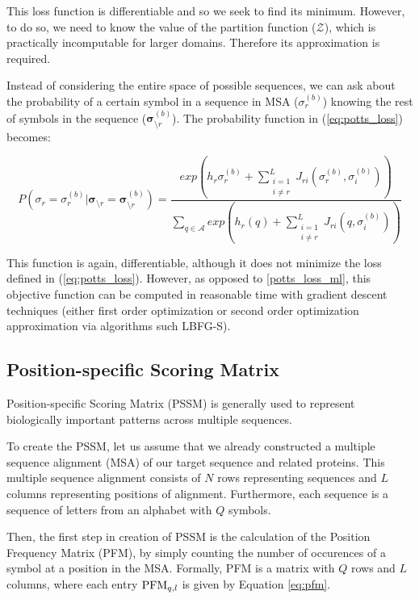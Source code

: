 This loss function is differentiable and so we seek to find its minimum. 
However, to do so, we need to know the value of the partition function ($\mathcal{Z}$), which is practically incomputable for larger domains. 
Therefore its approximation is required.
        
Instead of considering the entire space of possible sequences, we can ask about the probability of a certain symbol in a sequence in MSA ($\sigma_r^{(b)}$) knowing the rest of symbols in the sequence ($\bm{\sigma}_{\setminus r}^{(b)}$). 
The probability function in (\ref{eq:potts_loss}) becomes:
        
$$
P(\sigma_{r} = \sigma_r^{(b)} | \bm{\sigma}_{\setminus r} = \bm{\sigma}_{\setminus r}^{(b)}) = \frac{exp \left(h_r \sigma_r^{(b)} + \sum_{\substack{i = 1\\i\neq r}}^L J_{ri}(\sigma_r^{(b)}, \sigma_i^{(b)})\right)}{\sum_{q \in \mathcal{A}} exp \left(h_r(q) + \sum_{\substack{i = 1\\i\neq r}}^L J_{ri}(q, \sigma_i^{(b)})\right)}$$
        
This function is again, differentiable, although it does not minimize the loss defined in (\ref{eq:potts_loss}).
However, as opposed to \ref{potts_loss_ml}, this objective function can be computed in reasonable time with gradient descent techniques (either first order optimization or second order optimization approximation via algorithms such LBFG-S)\cite{potts1, potts2}.
        
\subsection{Position-specific Scoring Matrix}

Position-specific Scoring Matrix (PSSM) is generally used to represent biologically important patterns across multiple sequences. 

To create the PSSM, let us assume that we already constructed a multiple sequence alignment (MSA) of our target sequence and related proteins.
This multiple sequence alignment consists of $N$ rows representing sequences and $L$ columns representing positions of alignment.
Furthermore, each sequence is a sequence of letters from an alphabet with $Q$ symbols.

Then, the first step in creation of PSSM is the calculation of the Position Frequency Matrix (PFM), by simply counting the number of occurences of a symbol at a position in the MSA.
Formally, PFM is a matrix with $Q$ rows and $L$ columns, where each entry $\operatorname{PFM}_{q, l}$ is given by Equation \ref{eq:pfm}.

